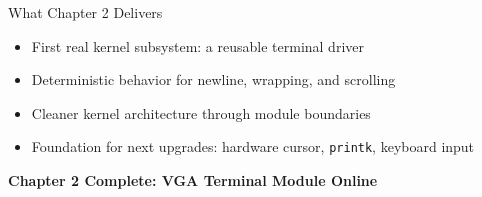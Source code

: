 \documentclass[aspectratio=169]{beamer}
\begin{document}
\begin{frame}{What Chapter 2 Delivers}
  \begin{itemize}
    \item First real kernel subsystem: a reusable terminal driver
    \item Deterministic behavior for newline, wrapping, and scrolling
    \item Cleaner kernel architecture through module boundaries
    \item Foundation for next upgrades: hardware cursor, \texttt{printk}, keyboard input
  \end{itemize}
  \vspace{8pt}
  \begin{center}
    \Large \textbf{Chapter 2 Complete: VGA Terminal Module Online}
  \end{center}
\end{frame}
\end{document}
